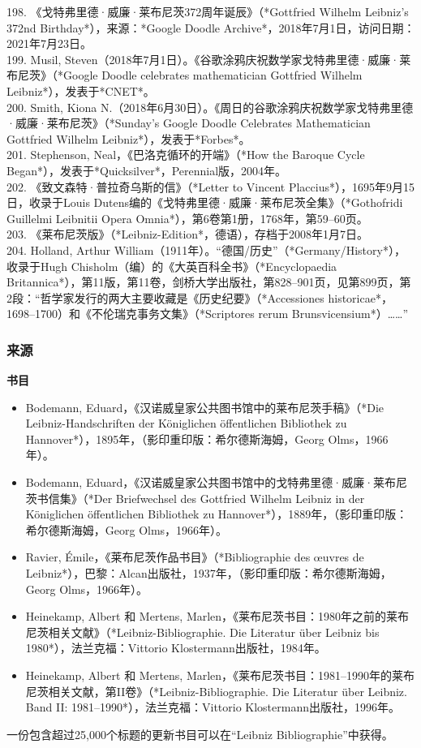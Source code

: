 198. 《戈特弗里德·威廉·莱布尼茨372周年诞辰》（*Gottfried Wilhelm Leibniz's 372nd Birthday*），来源：*Google Doodle Archive*，2018年7月1日，访问日期：2021年7月23日。\\
199. Musil, Steven（2018年7月1日）。《谷歌涂鸦庆祝数学家戈特弗里德·威廉·莱布尼茨》（*Google Doodle celebrates mathematician Gottfried Wilhelm Leibniz*），发表于*CNET*。\\
200. Smith, Kiona N.（2018年6月30日）。《周日的谷歌涂鸦庆祝数学家戈特弗里德·威廉·莱布尼茨》（*Sunday's Google Doodle Celebrates Mathematician Gottfried Wilhelm Leibniz*），发表于*Forbes*。\\
201. Stephenson, Neal，《巴洛克循环的开端》（*How the Baroque Cycle Began*），发表于*Quicksilver*，Perennial版，2004年。\\
202. 《致文森特·普拉奇乌斯的信》（*Letter to Vincent Placcius*），1695年9月15日，收录于Louis Dutens编的《戈特弗里德·威廉·莱布尼茨全集》（*Gothofridi Guillelmi Leibnitii Opera Omnia*），第6卷第1册，1768年，第59–60页。\\
203. 《莱布尼茨版》（*Leibniz-Edition*，德语），存档于2008年1月7日。\\
204. Holland, Arthur William（1911年）。“德国/历史”（*Germany/History*），收录于Hugh Chisholm（编）的《大英百科全书》（*Encyclopaedia Britannica*），第11版，第11卷，剑桥大学出版社，第828–901页，见第899页，第2段：“哲学家发行的两大主要收藏是《历史纪要》（*Accessiones historicae*，1698–1700）和《不伦瑞克事务文集》（*Scriptores rerum Brunsvicensium*）……”\\
\subsubsection{来源}  
\textbf{书目}  
\begin{itemize}
\item Bodemann, Eduard，《汉诺威皇家公共图书馆中的莱布尼茨手稿》（*Die Leibniz-Handschriften der Königlichen öffentlichen Bibliothek zu Hannover*），1895年，（影印重印版：希尔德斯海姆，Georg Olms，1966年）。  
\item Bodemann, Eduard，《汉诺威皇家公共图书馆中的戈特弗里德·威廉·莱布尼茨书信集》（*Der Briefwechsel des Gottfried Wilhelm Leibniz in der Königlichen öffentlichen Bibliothek zu Hannover*），1889年，（影印重印版：希尔德斯海姆，Georg Olms，1966年）。  
\item Ravier, Émile，《莱布尼茨作品书目》（*Bibliographie des œuvres de Leibniz*），巴黎：Alcan出版社，1937年，（影印重印版：希尔德斯海姆，Georg Olms，1966年）。  
\item Heinekamp, Albert 和 Mertens, Marlen，《莱布尼茨书目：1980年之前的莱布尼茨相关文献》（*Leibniz-Bibliographie. Die Literatur über Leibniz bis 1980*），法兰克福：Vittorio Klostermann出版社，1984年。  
\item Heinekamp, Albert 和 Mertens, Marlen，《莱布尼茨书目：1981–1990年的莱布尼茨相关文献，第II卷》（*Leibniz-Bibliographie. Die Literatur über Leibniz. Band II: 1981–1990*），法兰克福：Vittorio Klostermann出版社，1996年。  
\end{itemize}
一份包含超过25,000个标题的更新书目可以在“Leibniz Bibliographie”中获得。

